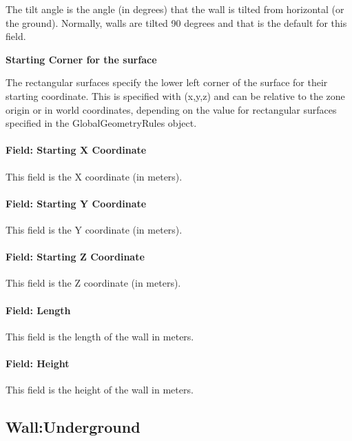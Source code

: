 The tilt angle is the angle (in degrees) that the wall is tilted from horizontal (or the ground). Normally, walls are tilted 90 degrees and that is the default for this field.

\begin{callout}
\textbf{Starting Corner for the surface}

The rectangular surfaces specify the lower left corner of the surface for their starting coordinate. This is specified with (x,y,z) and can be relative to the zone origin or in world coordinates, depending on the value for rectangular surfaces specified in the GlobalGeometryRules object.
\end{callout}

\paragraph{Field: Starting X Coordinate}\label{field-starting-x-coordinate-1}

This field is the X coordinate (in meters).

\paragraph{Field: Starting Y Coordinate}\label{field-starting-y-coordinate-1}

This field is the Y coordinate (in meters).

\paragraph{Field: Starting Z Coordinate}\label{field-starting-z-coordinate-1}

This field is the Z coordinate (in meters).

\paragraph{Field: Length}\label{field-length-1}

This field is the length of the wall in meters.

\paragraph{Field: Height}\label{field-height-1}

This field is the height of the wall in meters.

\subsection{Wall:Underground}\label{wallunderground}

